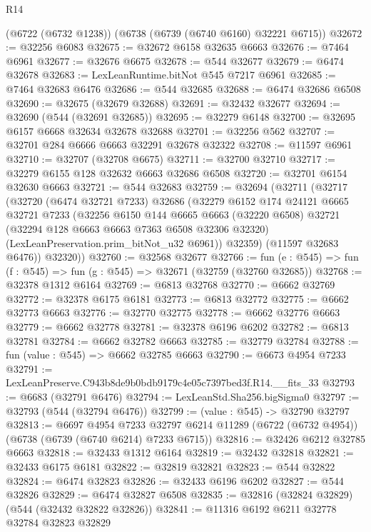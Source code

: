 \begin{lexlean}{R14}
\begin{coremodule}
    (@6722 (@6732 @1238))
    (@6738 (@6739 (@6740 @6160) @32221 @6715))
@32672 := @32256 @6083
@32675 := @32672 @6158 @32635 @6663
@32676 := @7464 @6961
@32677 := @32676 @6675
@32678 := @544 @32677
@32679 := @6474 @32678
@32683 := LexLeanRuntime.bitNot @545 @7217 @6961
@32685 := @7464 @32683 @6476
@32686 := @544 @32685
@32688 := @6474 @32686 @6508
@32690 := @32675 (@32679 @32688)
@32691 := @32432 @32677
@32694 := @32690 (@544 (@32691 @32685))
@32695 := @32279 @6148
@32700 := @32695 @6157 @6668 @32634 @32678 @32688
@32701 := @32256 @562
@32707 := @32701 @284 @6666 @6663 @32291 @32678 @32322
@32708 := @11597 @6961
@32710 := @32707 (@32708 @6675)
@32711 := @32700 @32710
@32717 := @32279 @6155 @128 @32632 @6663 @32686 @6508
@32720 := @32701 @6154 @32630 @6663
@32721 := @544 @32683
@32759 := @32694
    (@32711
      (@32717
        (@32720
          (@6474 @32721 @7233)
          @32686
          (@32279
            @6152
            @174
            @24121
            @6665
            @32721
            @7233
            (@32256
              @6150
              @144
              @6665
              @6663
              (@32220 @6508)
              @32721
              (@32294 @128 @6663 @6663 @7363 @6508 @32306 @32320)
              (LexLeanPreservation.prim_bitNot_u32 @6961))
            @32359)
          (@11597 @32683 @6476))
        @32320))
@32760 := @32568 @32677
@32766 := fun (e : @545) => fun (f : @545) => fun (g : @545) => @32671 (@32759 (@32760 @32685))
@32768 := @32378 @1312 @6164
@32769 := @6813 @32768
@32770 := @6662 @32769
@32772 := @32378 @6175 @6181
@32773 := @6813 @32772
@32775 := @6662 @32773 @6663
@32776 := @32770 @32775
@32778 := @6662 @32776 @6663
@32779 := @6662 @32778
@32781 := @32378 @6196 @6202
@32782 := @6813 @32781
@32784 := @6662 @32782 @6663
@32785 := @32779 @32784
@32788 := fun (value : @545) => @6662 @32785 @6663
@32790 := @6673 @4954 @7233
@32791 := LexLeanPreserve.C943b8de9b0bdb9179c4e05c7397bed3f.R14.__fits_33
@32793 := @6683 (@32791 @6476)
@32794 := LexLeanStd.Sha256.bigSigma0
@32797 := @32793 (@544 (@32794 @6476))
@32799 := (value : @545) -> @32790 @32797
@32813 := @6697
    @4954
    @7233
    @32797
    @6214
    @11289
    (@6722 (@6732 @4954))
    (@6738 (@6739 (@6740 @6214) @7233 @6715))
@32816 := @32426 @6212 @32785 @6663
@32818 := @32433 @1312 @6164
@32819 := @32432 @32818
@32821 := @32433 @6175 @6181
@32822 := @32819 @32821
@32823 := @544 @32822
@32824 := @6474 @32823
@32826 := @32433 @6196 @6202
@32827 := @544 @32826
@32829 := @6474 @32827 @6508
@32835 := @32816 (@32824 @32829) (@544 (@32432 @32822 @32826))
@32841 := @11316 @6192 @6211 @32778 @32784 @32823 @32829

\end{coremodule}
\end{lexlean}
